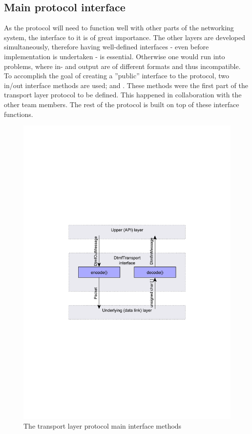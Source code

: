 \subsection{Main protocol interface}
As the protocol will need to function well with other parts of the networking system, the interface to it is of great importance. The other layers are developed simultaneously, therefore having well-defined interfaces - even before implementation is undertaken - is essential. Otherwise one would run into problems, where in- and output are of different formats and thus incompatible. To accomplish the goal of creating a ''public'' interface to the protocol, two in/out interface methods are used;  and . These methods were the first part of the transport layer protocol to be defined. This happened in collaboration with the other team members. The rest of the protocol is built on top of these interface functions.

\begin{figure}[htb]
 \centering
 \includegraphics[scale=0.66,trim=0 280 0 275]{content/graphics/transport/trans_encode_decode.pdf}%
 \caption{The transport layer protocol main interface methods}
 \label{fig:trans_encode_decode}
\end{figure}

